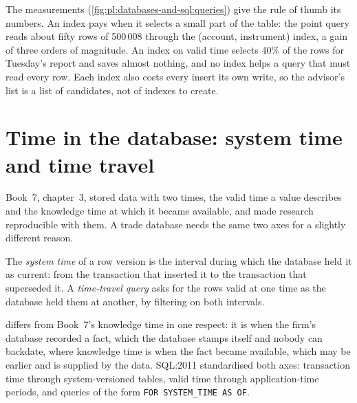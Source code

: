 The measurements (\cref{fig:pl:databases-and-sql:queries}) give the rule of thumb its numbers. An index pays when it selects a small part of
the table: the point query reads about fifty rows of 500\,008 through the (account, instrument) index, a gain of three orders of magnitude.
An index on valid time selects 40\% of the rows for Tuesday's report and saves almost nothing, and no index helps a query that must read every
row. Each index also costs every insert its own write, so the advisor's list is a list of candidates, not of indexes to create.

\section{Time in the database: system time and time travel}

Book~7, chapter~3, stored data with two times, the valid time a value describes and the knowledge time at which it became available, and made
research reproducible with them. A trade database needs the same two axes for a slightly different reason.

\begin{definition}\label{def:pl:databases-and-sql:system}
The \emph{system time} of a row version is the interval during which the database held it as current: from the
transaction that inserted it to the transaction that superseded it. A \emph{time-travel query} asks for the rows
valid at one time as the database held them at another, by filtering on both intervals.
\end{definition}

 differs from Book~7's knowledge time in one respect: it is when the firm's database recorded a fact, which the database stamps
itself and nobody can backdate, where knowledge time is when the fact became available, which may be earlier and is supplied by the data.
SQL:2011 standardised both axes: transaction time through system-versioned tables, valid time through application-time periods, and queries
of the form \texttt{FOR SYSTEM\_TIME AS OF}.

\label{lst:pl:databases-and-sql:correct}

